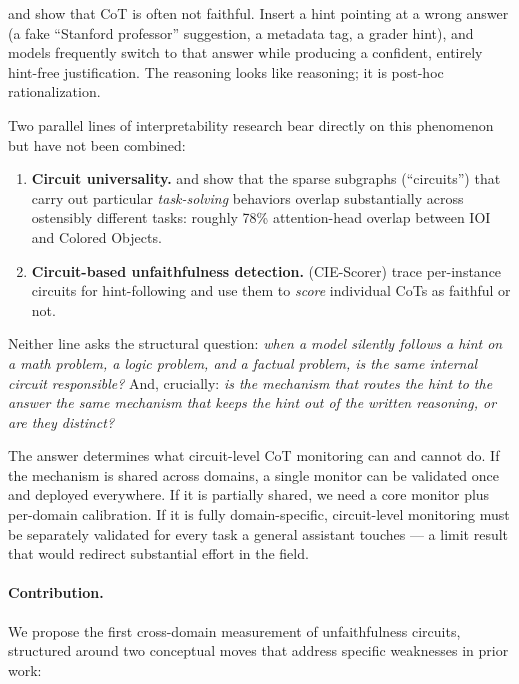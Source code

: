 \documentclass[11pt]{article}
\begin{document}
\citet{turpin2023} and \citet{chen2025} show that CoT is often not faithful. Insert a hint pointing at a wrong answer (a fake ``Stanford professor'' suggestion, a metadata tag, a grader hint), and models frequently switch to that answer while producing a confident, entirely hint-free justification. The reasoning looks like reasoning; it is post-hoc rationalization.

Two parallel lines of interpretability research bear directly on this phenomenon but have not been combined:

\begin{enumerate}[leftmargin=1.2em, itemsep=2pt]
  \item \textbf{Circuit universality.} \citet{merullo2024} and \citet{hanna2024} show that the sparse subgraphs (``circuits'') that carry out particular \emph{task-solving} behaviors overlap substantially across ostensibly different tasks: roughly 78\% attention-head overlap between IOI and Colored Objects.
  \item \textbf{Circuit-based unfaithfulness detection.} \citet{shen2026} (CIE-Scorer) trace per-instance circuits for hint-following and use them to \emph{score} individual CoTs as faithful or not.
\end{enumerate}

Neither line asks the structural question: \emph{when a model silently follows a hint on a math problem, a logic problem, and a factual problem, is the same internal circuit responsible?} And, crucially: \emph{is the mechanism that routes the hint to the answer the same mechanism that keeps the hint out of the written reasoning, or are they distinct?}

The answer determines what circuit-level CoT monitoring can and cannot do. If the mechanism is shared across domains, a single monitor can be validated once and deployed everywhere. If it is partially shared, we need a core monitor plus per-domain calibration. If it is fully domain-specific, circuit-level monitoring must be separately validated for every task a general assistant touches --- a limit result that would redirect substantial effort in the field.

\paragraph{Contribution.} We propose the first cross-domain measurement of unfaithfulness circuits, structured around two conceptual moves that address specific weaknesses in prior work:
\end{document}
